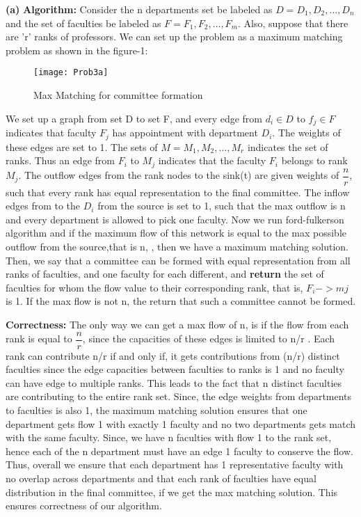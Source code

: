 \documentclass{article}
\renewcommand\part[1]{\vspace{.10in}\textbf{(#1)}}
\newcommand\algo{\vspace{.10in}\textbf{Algorithm: }}
\newcommand\correctness{\vspace{.10in}\textbf{Correctness: }}
\begin{document}
   \part{a}
   \algo Consider the n departments set be labeled as $D={D_1, D_2, \dots, D_n}$ and the set of faculties be labeled as $F = {F_1, F_2, \dots , F_m}$. Also, suppose that there are 'r' ranks of professors. We can set up the problem as a maximum matching problem as shown in the figure-1: \newline
  \begin{figure}[H]
   \centering
  \texttt{[image: Prob3a]}
  \caption{Max Matching for committee formation}
  \end{figure}
  We set up a graph from set D to set F, and every edge from $d_i \in D$ to $f_j \in F$ indicates that faculty $F_j$ has appointment with department $D_i$. The weights of these edges are set to 1. The sets of $M={M_1, M_2, \dots , M_r}$ indicates the set of ranks. Thus an edge from $F_i$ to $M_j$ indicates that the faculty $F_i$ belongs to rank $M_j$. The outflow edges from the rank nodes to the sink(t) are given weights of $\dfrac{n}{r}$, such that every rank has equal representation to the final committee. The inflow edges from to the $D_i$ from the source is set to 1, such that the max outflow is n and every department is allowed to pick one faculty. Now we run ford-fulkerson algorithm and if the maximum flow of this network is equal to the max possible outflow from the source,that is n, , then we have a maximum matching solution. Then, we say that a committee can be formed with equal representation from all ranks of faculties, and one faculty for each different, and \textbf {return} the set of faculties for whom the flow value to their corresponding rank, that is, $F_i -> mj$ is 1.  If the max flow is not n, the return that such a committee cannot be formed. \newline

  \correctness The only way we can get a max flow of n, is if the flow from each rank is equal to $\dfrac{n}{r}$, since the capacities of these edges is limited to n/r . Each rank can contribute n/r if and only if, it gets contributions from (n/r) distinct faculties since the edge capacities between faculties to ranks is 1 and no faculty can have edge to multiple ranks. This leads to the fact that n distinct faculties are contributing to the entire rank set. Since, the edge weights from departments to faculties is also 1, the maximum matching solution ensures that one department gets flow 1 with exactly 1 faculty and no two departments gets match with the same faculty. Since, we have n faculties with flow 1 to the rank set, hence each of the n department must have an edge 1 faculty to conserve the flow. Thus, overall we ensure that each department has 1 representative faculty with no overlap across departments and that each rank of faculties have equal distribution in the final committee, if we get the max matching solution. This ensures correctness of our algorithm. \newline
\end{document}
